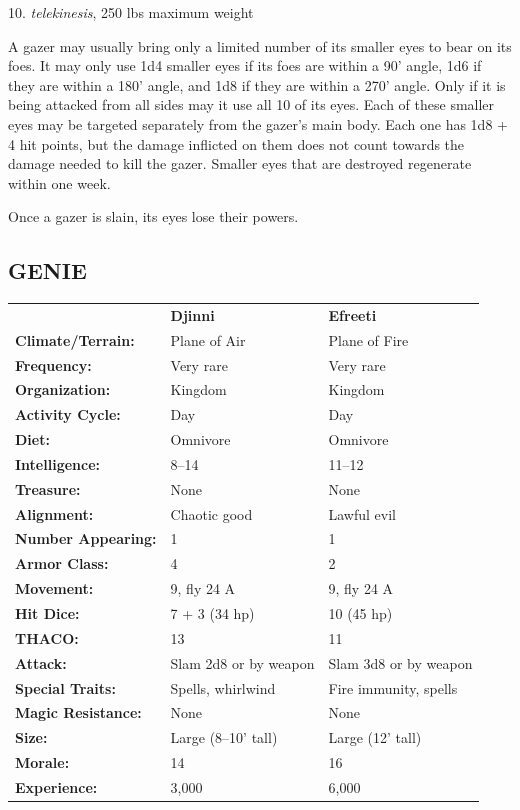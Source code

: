 \begin{multicols}{2}
10. \textit{telekinesis}, 250 lbs maximum weight

A gazer may usually bring only a limited number of its smaller eyes to bear on its foes. It may only use 1d4 smaller eyes if its foes are within a 90' angle, 1d6 if they are within a 180' angle, and 1d8 if they are within a 270' angle. Only if it is being attacked from all sides may it use all 10 of its eyes. Each of these smaller eyes may be targeted separately from the gazer's main body. Each one has 1d8 + 4 hit points, but the damage inflicted on them does not count towards the damage needed to kill the gazer. Smaller eyes that are destroyed regenerate within one week.

Once a gazer is slain, its eyes lose their powers.

\noindent \begin{minipage}{\columnwidth}

\vspace{1em}

\subsection{GENIE}

\noindent \begin{tabular}{p{}g{.24\columnwidth}p{.24\columnwidth}}
	& \textbf{Djinni}	& \textbf{Efreeti}	\\
\textbf{Climate/Terrain:}	& Plane of Air	& Plane of Fire \\
\textbf{Frequency:} 		& Very rare	& Very rare \\
\textbf{Organization:} 		& Kingdom	& Kingdom \\
\textbf{Activity Cycle:} 	& Day	& Day \\
\textbf{Diet:} 				& Omnivore	& Omnivore \\
\textbf{Intelligence:} 		& 8--14	& 11--12 \\
\textbf{Treasure:} 			& None & None	\\
\textbf{Alignment:} 		& Chaotic good	& Lawful evil \\
\hline
\textbf{Number Appearing:} 	& 1	& 1 \\
\textbf{Armor Class:} 		& 4	& 2 \\
\textbf{Movement:} 			& 9, fly 24 A	& 9, fly 24 A \\
\textbf{Hit Dice:} 			& 7 + 3 (34 hp)	& 10 (45 hp) \\
\textbf{THACO:} 			& 13	& 11 \\
\textbf{Attack:} 			& Slam 2d8 or by weapon	& Slam 3d8 or by weapon\\
\textbf{Special Traits:} & Spells, whirlwind	& Fire immunity, spells \\
\textbf{Magic Resistance:} 	& None	& None \\
\textbf{Size:} 				& Large (8--10' tall)	& Large (12' tall) \\
\textbf{Morale:} 			& 14	& 16 \\
\textbf{Experience:} 		& 3,000	& 6,000 \\ %
\end{tabular}


\end{minipage}
\end{multicols}
